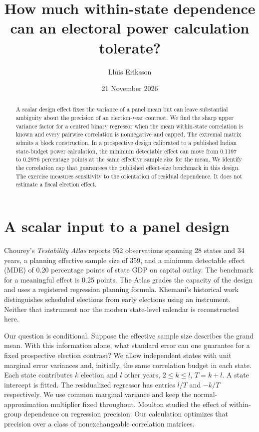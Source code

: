 \documentclass[11pt]{article}
\title{How much within-state dependence can an electoral power calculation tolerate?}
\author{Lluis Eriksson}\date{21 November 2026}
\begin{document}
\maketitle
\begin{abstract}
A scalar design effect fixes the variance of a panel mean but can leave substantial ambiguity about the precision of an election-year contrast. We find the sharp upper variance factor for a centred binary regressor when the mean within-state correlation is known and every pairwise correlation is nonnegative and capped. The extremal matrix admits a block construction. In a prospective design calibrated to a published Indian state-budget power calculation, the minimum detectable effect can move from 0.1197 to 0.2976 percentage points at the same effective sample size for the mean. We identify the correlation cap that guarantees the published effect-size benchmark in this design. The exercise measures sensitivity to the orientation of residual dependence. It does not estimate a fiscal election effect.
\end{abstract}

\section{A scalar input to a panel design}
Chourey's \emph{Testability Atlas} \cite{atlas} reports 952 observations spanning 28 states and 34 years, a planning effective sample size of 359, and a minimum detectable effect (MDE) of 0.20 percentage points of state GDP on capital outlay. The benchmark for a meaningful effect is 0.25 points. The Atlas grades the capacity of the design and uses a registered regression planning formula. Khemani's historical work \cite{khemani} distinguishes scheduled elections from early elections using an instrument. Neither that instrument nor the modern state-level calendar is reconstructed here.

Our question is conditional. Suppose the effective sample size describes the grand mean. With this information alone, what standard error can one guarantee for a fixed prospective election contrast? We allow independent states with unit marginal error variances and, initially, the same correlation budget in each state. Each state contributes $k$ election and $l$ other years, $2\le k\le l$, $T=k+l$. A state intercept is fitted. The residualized regressor has entries $l/T$ and $-k/T$ respectively. We use common marginal variance and keep the normal-approximation multiplier fixed throughout. Moulton \cite{moulton} studied the effect of within-group dependence on regression precision. Our calculation optimizes that precision over a class of nonexchangeable correlation matrices.
\end{document}
